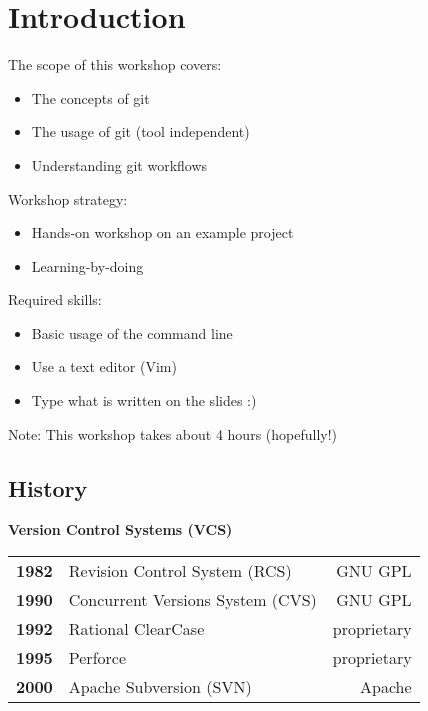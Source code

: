\section{Introduction}
\begin{frame}
  \slidetitle
  The scope of this workshop covers:
  \begin{itemize}
    \item The concepts of git
    \item The usage of git (tool independent)
    \item Understanding git workflows
  \end{itemize}

  \pause
  \vspace{1em}
  Workshop strategy:
  \begin{itemize}
    \item Hands-on workshop on an example project
    \item Learning-by-doing
  \end{itemize}

  \pause
  \vspace{1em}
  Required skills:
  \begin{itemize}
    \item Basic usage of the command line
    \item Use a text editor (Vim)
    \item Type what is written on the slides :)
  \end{itemize}

  \vspace{1em}
  Note: This workshop takes about 4 hours (hopefully!)
\end{frame}

\subsection{History}
\begin{frame}
  \subslidetitle

  \textbf{Version Control Systems (VCS)}
  \pause
  \\
  \begin{tabular}{lp{6cm}r}
    \textbf{1982} & Revision Control System (RCS) & GNU GPL \\
    \pause
    \textbf{1990} & Concurrent Versions System (CVS) & GNU GPL \\
    \pause
    \textbf{1992} & Rational ClearCase & proprietary \\
    \pause
    \textbf{1995} & Perforce  & proprietary \\
    \pause
    \textbf{2000} & Apache Subversion (SVN)  & Apache \\
  \end{tabular}
\end{frame}


